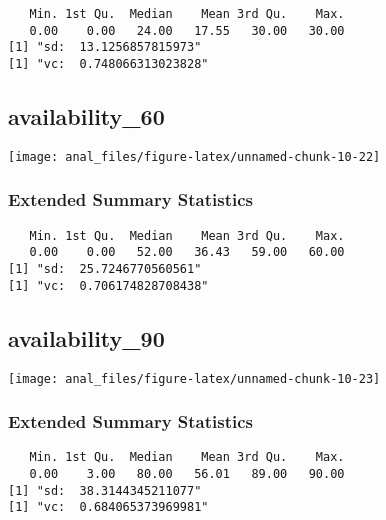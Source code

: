 \begin{verbatim}   Min. 1st Qu.  Median    Mean 3rd Qu.    Max. 
   0.00    0.00   24.00   17.55   30.00   30.00 
[1] "sd:  13.1256857815973"
[1] "vc:  0.748066313023828"
\end{verbatim}

\pagebreak

\hypertarget{availability_60}{%
\subsection{availability\_60}\label{availability_60}}

\begin{center}\texttt{[image: anal\_files/figure-latex/unnamed-chunk-10-22]} \end{center}

\hypertarget{extended-summary-statistics-8}{%
\subsubsection{Extended Summary
Statistics}\label{extended-summary-statistics-8}}

\begin{verbatim}   Min. 1st Qu.  Median    Mean 3rd Qu.    Max. 
   0.00    0.00   52.00   36.43   59.00   60.00 
[1] "sd:  25.7246770560561"
[1] "vc:  0.706174828708438"
\end{verbatim}

\pagebreak

\hypertarget{availability_90}{%
\subsection{availability\_90}\label{availability_90}}

\begin{center}\texttt{[image: anal\_files/figure-latex/unnamed-chunk-10-23]} \end{center}

\hypertarget{extended-summary-statistics-9}{%
\subsubsection{Extended Summary
Statistics}\label{extended-summary-statistics-9}}

\begin{verbatim}   Min. 1st Qu.  Median    Mean 3rd Qu.    Max. 
   0.00    3.00   80.00   56.01   89.00   90.00 
[1] "sd:  38.3144345211077"
[1] "vc:  0.684065373969981"
\end{verbatim}

